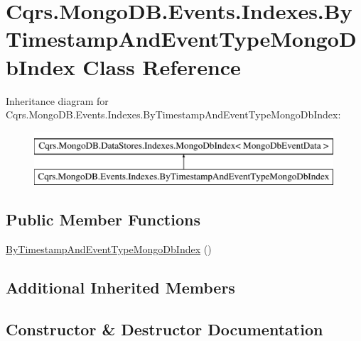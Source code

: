 \hypertarget{classCqrs_1_1MongoDB_1_1Events_1_1Indexes_1_1ByTimestampAndEventTypeMongoDbIndex}{}\section{Cqrs.\+Mongo\+D\+B.\+Events.\+Indexes.\+By\+Timestamp\+And\+Event\+Type\+Mongo\+Db\+Index Class Reference}
\label{classCqrs_1_1MongoDB_1_1Events_1_1Indexes_1_1ByTimestampAndEventTypeMongoDbIndex}
Inheritance diagram for Cqrs.\+Mongo\+D\+B.\+Events.\+Indexes.\+By\+Timestamp\+And\+Event\+Type\+Mongo\+Db\+Index\+:\begin{figure}[H]
\begin{center}
\leavevmode
\includegraphics[height=2.000000cm]{classCqrs_1_1MongoDB_1_1Events_1_1Indexes_1_1ByTimestampAndEventTypeMongoDbIndex}
\end{center}
\end{figure}
\subsection*{Public Member Functions}
\begin{DoxyCompactItemize}
\item 
\hyperlink{classCqrs_1_1MongoDB_1_1Events_1_1Indexes_1_1ByTimestampAndEventTypeMongoDbIndex_ac31e888bf88b4cabc9f7be0dd1fc3ffc_ac31e888bf88b4cabc9f7be0dd1fc3ffc}{By\+Timestamp\+And\+Event\+Type\+Mongo\+Db\+Index} ()
\end{DoxyCompactItemize}
\subsection*{Additional Inherited Members}


\subsection{Constructor \& Destructor Documentation}
\mbox{\label{classCqrs_1_1MongoDB_1_1Events_1_1Indexes_1_1ByTimestampAndEventTypeMongoDbIndex_ac31e888bf88b4cabc9f7be0dd1fc3ffc_ac31e888bf88b4cabc9f7be0dd1fc3ffc}} 
